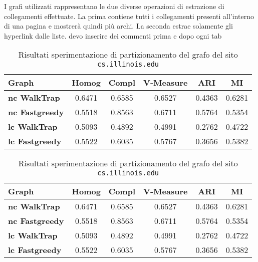 I grafi utilizzati rappresentano le due diverse operazioni di estrazione di collegamenti effettuate. La prima contiene tutti i collegamenti presenti all'interno di una pagina e mostrerà quindi più archi. La seconda estrae solamente gli hyperlink dalle liste.
\color{red} devo inserire dei commenti prima e dopo ogni tab \color{black}
\begin{table}[H]
	\begin{tabular}{| l | c | c | c | c | c |}
	\hline
	\textbf{Graph}  & \textbf{Homog} & \textbf{Compl} & \textbf{V-Measure}  & \textbf{ARI}  & \textbf{MI} \\ [3ex] \hline
	\textbf{nc WalkTrap} & 0.6471 & 0.6585 & 0.6527 & 0.4363 & 0.6281\\ [3ex]
	 \hline
	\textbf{nc Fastgreedy} & 0.5518 & 0.8563 & 0.6711 & 0.5764 & 0.5354\\ [3ex]
	 \hline	
	\textbf{lc WalkTrap} & 0.5093 & 0.4892 & 0.4991 & 0.2762 & 0.4722\\ [3ex]
	 \hline	
	\textbf{lc Fastgreedy} & 0.5522 & 0.6035 & 0.5767 & 0.3656 & 0.5382\\ [3ex]
	\hline
	\end{tabular}
	\caption{Risultati sperimentazione di partizionamento del grafo del sito \texttt{cs.illinois.edu}}
	\label{metricheGraphIll}
\end{table}

\begin{table}[H]
	\begin{tabular}{| l | c | c | c | c | c |}
	\hline
	\textbf{Graph}  & \textbf{Homog} & \textbf{Compl} & \textbf{V-Measure}  & \textbf{ARI}  & \textbf{MI} \\ [3ex] \hline
	\textbf{nc WalkTrap} & 0.6471 & 0.6585 & 0.6527 & 0.4363 & 0.6281\\ [3ex]
	 \hline
	\textbf{nc Fastgreedy} & 0.5518 & 0.8563 & 0.6711 & 0.5764 & 0.5354\\ [3ex]
	 \hline	
	\textbf{lc WalkTrap} & 0.5093 & 0.4892 & 0.4991 & 0.2762 & 0.4722\\ [3ex]
	 \hline	
	\textbf{lc Fastgreedy} & 0.5522 & 0.6035 & 0.5767 & 0.3656 & 0.5382\\ [3ex]
	\hline
	\end{tabular}
	\caption{Risultati sperimentazione di partizionamento del grafo del sito \texttt{cs.illinois.edu}}
	\label{metricheGraphIll}
\end{table}

